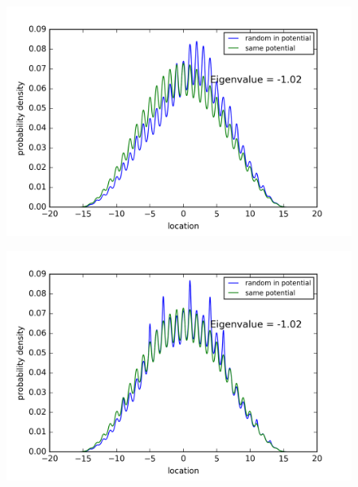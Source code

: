 \begin{figure}[!htbh]
\centering
\begin{minipage}{.45\textwidth}
  \centering
  \includegraphics[width=1.1\linewidth]{RandomPotential2/1_0a_1th_Lowest_Rand0_4_0_5.png}
  \label{fig:randPoa1_1th_0.5_0.4}
\end{minipage}\qquad
\begin{minipage}{.45\textwidth}
  \centering
  \includegraphics[width=1.1\linewidth]{RandomPotential2/1_0a_1th_Lowest_Rand0_2_0_5.png}
  \label{fig:randPoa1_1th_0.5_0.2}
\end{minipage}
\end{figure}

